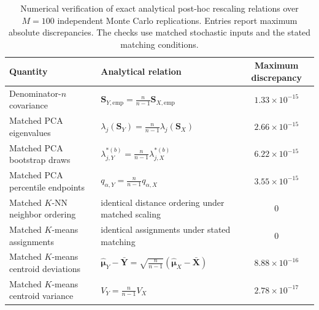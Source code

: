 \begin{table}[htbp]
\centering
\small
\setlength{\tabcolsep}{4pt}
\caption{Numerical verification of exact analytical post-hoc rescaling relations over $M=100$ independent Monte Carlo replications. Entries report maximum absolute discrepancies. The checks use matched stochastic inputs and the stated matching conditions.}
\label{tab:posthoc_benchmarks}
\begin{tabular}{p{3.7cm}p{4.6cm}c}
\hline\hline
\textbf{Quantity} & \textbf{Analytical relation} & \textbf{Maximum discrepancy} \\
\hline
Denominator-$n$ covariance & $\mathbf{S}_{Y,\mathrm{emp}}=\frac{n}{n-1}\mathbf{S}_{X,\mathrm{emp}}$ & $1.33\times 10^{-15}$ \\
Matched PCA eigenvalues & $\lambda_j(\mathbf{S}_Y)=\frac{n}{n-1}\lambda_j(\mathbf{S}_X)$ & $2.66\times 10^{-15}$ \\
Matched PCA bootstrap draws & $\lambda_{j,Y}^{*(b)}=\frac{n}{n-1}\lambda_{j,X}^{*(b)}$ & $6.22\times 10^{-15}$ \\
Matched PCA percentile endpoints & $q_{\alpha,Y}=\frac{n}{n-1}q_{\alpha,X}$ & $3.55\times 10^{-15}$ \\
Matched $K$-NN neighbor ordering & identical distance ordering under matched scaling & $0$ \\
Matched $K$-means assignments & identical assignments under stated matching & $0$ \\
Matched $K$-means centroid deviations & $\widehat{\boldsymbol{\mu}}_Y-\bar{\mathbf{Y}}=\sqrt{\frac{n}{n-1}}(\widehat{\boldsymbol{\mu}}_X-\bar{\mathbf{X}})$ & $8.88\times 10^{-16}$ \\
Matched $K$-means centroid variance & $V_Y=\frac{n}{n-1}V_X$ & $2.78\times 10^{-17}$ \\
\hline\hline
\end{tabular}
\end{table}


